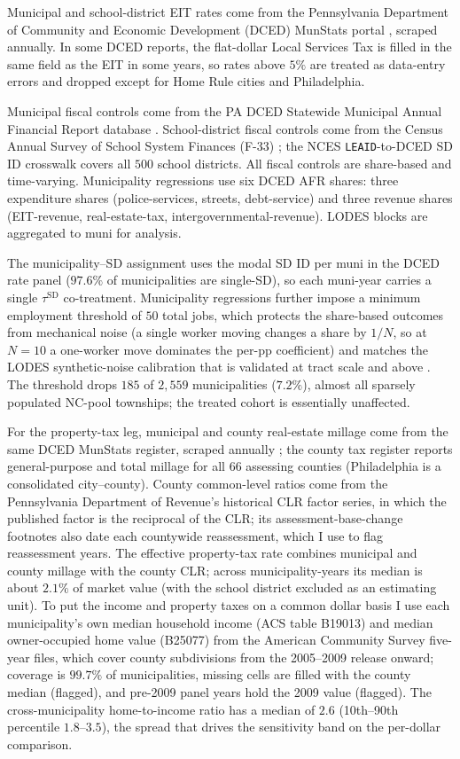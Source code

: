 \documentclass[12pt]{article}
\begin{document}
Municipal and school-district EIT rates come from the Pennsylvania
Department of Community and Economic Development (DCED) MunStats
portal \citep{padcedMunStats}, scraped annually. In some DCED reports, the flat-dollar Local Services Tax is filled in the same field
as the EIT in some years, so rates above $5\%$ are treated as
data-entry errors and dropped except for Home Rule cities and Philadelphia.

Municipal fiscal controls come from the PA DCED Statewide Municipal
Annual Financial Report database \citep{padcedAFR}. School-district
fiscal controls come from the Census Annual Survey of School System
Finances (F-33) \citep{censusF33}; the NCES \texttt{LEAID}-to-DCED
SD ID crosswalk covers all $500$ school districts. All fiscal
controls are share-based and time-varying. Municipality regressions
use six DCED AFR shares: three expenditure shares
(police-services, streets, debt-service) and three revenue shares
(EIT-revenue, real-estate-tax, intergovernmental-revenue).
LODES blocks are aggregated to muni for analysis.

The municipality--SD assignment uses the modal SD ID per muni in
the DCED rate panel ($97.6\%$ of municipalities are single-SD), so
each muni-year carries a single $\tau^{\text{SD}}$ co-treatment.
Municipality regressions
further impose a
minimum employment threshold of $50$ total jobs, which protects the
share-based outcomes from mechanical noise (a single worker moving
changes a share by $1/N$, so at $N=10$ a one-worker move dominates
the per-pp coefficient) and matches the LODES synthetic-noise
calibration that is validated at tract scale and above
\citep{grahamDESIGNCOMPARISONLODES}. The threshold drops $185$ of
$2{,}559$ municipalities ($7.2\%$), almost all sparsely populated
NC-pool townships; the treated cohort is essentially unaffected.

For the property-tax leg, municipal and county real-estate millage come
from the same DCED MunStats register, scraped annually
\citep{padcedMunStats}; the county tax register reports general-purpose
and total millage for all $66$ assessing counties (Philadelphia is a
consolidated city--county). County common-level ratios come from the
Pennsylvania Department of Revenue's historical CLR factor series, in
which the published factor is the reciprocal of the CLR; its
assessment-base-change footnotes also date each countywide reassessment,
which I use to flag reassessment years. The effective property-tax rate
combines municipal and county millage with the county CLR; across
municipality-years its median is about $2.1\%$ of market value (with the
school district excluded as an estimating unit). To put the income and
property taxes on a common dollar basis I use each municipality's own
median household income (ACS table B19013) and median owner-occupied
home value (B25077) from the American Community Survey five-year files,
which cover county subdivisions from the 2005--2009 release onward;
coverage is $99.7\%$ of municipalities, missing cells are filled with the
county median (flagged), and pre-2009 panel years hold the 2009 value
(flagged). The cross-municipality home-to-income ratio has a median of
$2.6$ (10th--90th percentile $1.8$--$3.5$), the spread that drives the
sensitivity band on the per-dollar comparison.
\end{document}

